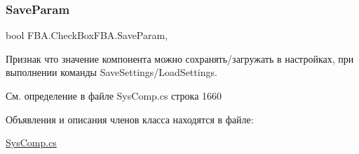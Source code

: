 \subsubsection{\texorpdfstring{Save\+Param}{SaveParam}}
{\footnotesize\ttfamily bool F\+B\+A.\+Check\+Box\+F\+B\+A.\+Save\+Param\hspace{0.3cm}{\ttfamily [get]}, {\ttfamily [set]}}



Признак что значение компонента можно сохранять/загружать в настройках, при выполнении команды Save\+Settings/\+Load\+Settings. ~\newline




См. определение в файле Sys\+Comp.\+cs строка 1660



Объявления и описания членов класса находятся в файле\+:\begin{DoxyCompactItemize}
\item 
\mbox{\hyperlink{_sys_comp_8cs}{Sys\+Comp.\+cs}}\end{DoxyCompactItemize}
